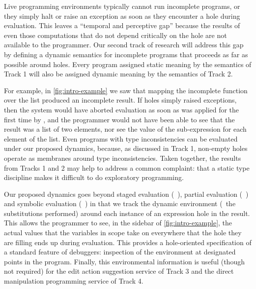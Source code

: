 Live programming environments typically cannot run incomplete programs, or they simply halt or raise an exception as soon as they encounter a hole during evaluation. This leaves a ``temporal and perceptive gap'' because the results of even those computations that do not depend critically on the hole are not available to the programmer. Our second track of research will address this gap by defining a dynamic semantics for incomplete programs that proceeds as far as possible around holes. 
Every program assigned static meaning by the semantics of Track 1 will also be assigned dynamic meaning by the semantics of Track 2.

For example, in \autoref{fig:intro-example} we saw that mapping the incomplete function  over the  list produced an incomplete result. If holes simply raised exceptions, then the system would have aborted evaluation as soon as  was applied for the first time by , and the programmer would not have been able to see that the result was a list of two elements, nor see the value of the sub-expression  for each element  of the  list. Even programs with type inconsistencies can be evaluated under our proposed dynamics, because, as discussed in Track 1, non-empty holes operate as membranes around type inconsistencies. Taken together, the results from Tracks 1 and 2 may help to address a common complaint: that a static type discipline makes it difficult to do exploratory programming. 

Our proposed dynamics goes beyond staged evaluation (\eg{}~\cite{Taha:1999}), partial evaluation (\eg{}~\cite{Jones:1993uq}) and symbolic evaluation (\eg{}~\cite{King:1976}) in that we track the dynamic environment (\ie{}~the substitutions performed) around each instance of an expression hole in the result. This allows the programmer to see, in the sidebar of \autoref{fig:intro-example}, the actual values that the variables in scope take on everywhere that the hole they are filling ends up during evaluation. This provides a hole-oriented specification of a standard feature of debuggers: inspection of the environment at designated points in the program. Finally, this environmental information is useful (though not required) for the edit action suggestion service of Track 3 and the direct manipulation programming service of Track 4. 

